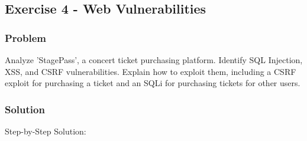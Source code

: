 \documentclass{article}
\begin{document}
\subsection{Exercise 4 - Web Vulnerabilities}
\subsubsection*{Problem}
Analyze 'StagePass', a concert ticket purchasing platform. Identify SQL Injection, XSS, and CSRF vulnerabilities. Explain how to exploit them, including a CSRF exploit for purchasing a ticket and an SQLi for purchasing tickets for other users.

\subsubsection*{Solution}
Step-by-Step Solution:
\end{document}
